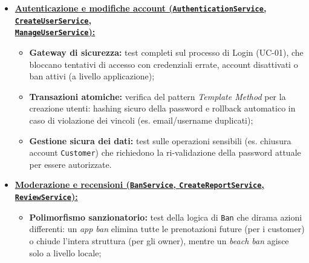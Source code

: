 \documentclass[a4paper,11pt]{article}
\begin{document}
\begin{itemize}[leftmargin=*]
\begin{itemize}[nosep]
		\item \textbf{Prenotazioni manuali (\texttt{Owner}):} Test del flusso B2B (UC-05 1a) che salta il check dell'utente e impone l'approvazione automatica (stato \texttt{CONFIRMED});
		
		\item \textbf{Vincoli temporali:} blocco di aggiornamenti, cancellazioni o approvazioni su prenotazioni la cui data coincida con quella odierna o passata.
	\end{itemize}

	\newpage
		
	\item \underline{\textbf{Autenticazione e modifiche account (\texttt{AuthenticationService}, \texttt{CreateUserService},}} \\ \underline{\textbf{\texttt{ManageUserService}):}}
	\label{itm:application_user}
	\begin{itemize}[nosep]
		\item \textbf{Gateway di sicurezza:} test completi sul processo di Login (UC-01), che bloccano tentativi di accesso con credenziali errate, account disattivati o ban attivi (a livello applicazione);
		
		\item \textbf{Transazioni atomiche:} verifica del pattern \textit{Template Method} per la creazione utenti: hashing sicuro della password e rollback automatico in caso di violazione dei vincoli (es. email/username duplicati);
		
		\item \textbf{Gestione sicura dei dati:} test sulle operazioni sensibili (es. chiusura account \texttt{Customer}) che richiedono la ri-validazione della password attuale per essere autorizzate.
	\end{itemize}
	
	\item \underline{\textbf{Moderazione e recensioni (\texttt{BanService}, \texttt{CreateReportService}, \texttt{ReviewService}):}}
	\label{itm:application_moderation}
	\begin{itemize}[nosep]
		\item \textbf{Polimorfismo sanzionatorio:} test della logica di \texttt{Ban} che dirama azioni differenti: un \textit{app ban} elimina tutte le prenotazioni future (per i customer) o chiude l'intera struttura (per gli owner), mentre un \textit{beach ban} agisce solo a livello locale;
		

\end{itemize}
\end{itemize}
\end{document}
